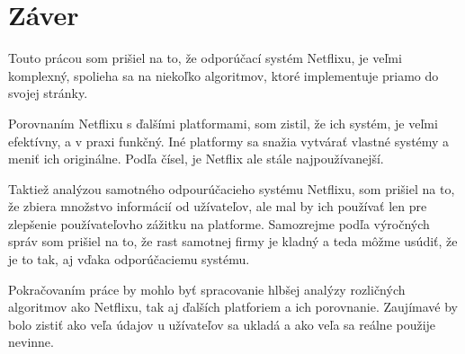 \documentclass[10pt,twoside,slovak,a4paper]{article}
\begin{document}
\section*{Záver}

Touto prácou som prišiel na to, že odporúčací systém Netflixu, je veľmi komplexný, spolieha sa na niekoľko algoritmov, ktoré implementuje priamo do svojej stránky.

Porovnaním Netflixu s ďalšími platformami, som zistil, že ich systém, je veľmi efektívny, a v praxi funkčný. Iné platformy sa snažia vytvárať vlastné systémy a meniť ich originálne. Podľa čísel, je Netflix ale stále najpoužívanejší.

Taktiež analýzou samotného odpourúčacieho systému Netflixu, som prišiel na to, že zbiera množstvo informácií od užívateľov, ale mal by ich používať len pre zlepšenie používateľovho zážitku na platforme. Samozrejme podľa výročných správ som prišiel na to, že rast samotnej firmy je kladný a teda môžme usúdiť, že je to tak, aj vďaka odporúčaciemu systému.

Pokračovaním práce by mohlo byť spracovanie hlbšej analýzy rozličných algoritmov ako Netflixu, tak aj ďalších platforiem a ich porovnanie. Zaujímavé by bolo zistiť ako veľa údajov u užívateľov sa ukladá a ako veľa sa reálne použije nevinne.



\end{document}
